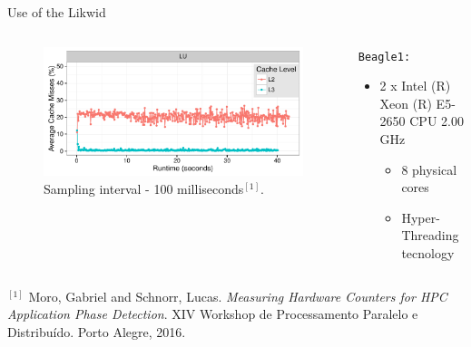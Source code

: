 \documentclass[12pt,xcolor=dvipsnames,presentation]{beamer}
\begin{document}
\begin{frame}[fragile,label={sec:orgd1f265d}]{Use of the Likwid}
 \begin{columns}\begin{column}{.45\linewidth}
\begin{figure}[!htb]
\includegraphics[width=\linewidth]{../../producao/2016_wsppd/img/lu_L2_L3_100ms.pdf}
\caption{Sampling interval - 100 milliseconds$^{[1]}$.}
\label{figFT}
\end{figure}

\end{column}
\begin{column}{.35\linewidth}
{\small
\texttt{Beagle1:}
\begin{itemize}
\item 2 x Intel (R) Xeon (R) E5-2650 CPU 2.00 GHz
\begin{itemize}
\item 8 physical cores
\item Hyper-Threading tecnology
\end{itemize}
\end{itemize}
}
\end{column}
\end{columns}

\vspace{2cm}
\hline
\vspace{0.2cm}
\tiny \(^{[1]}\) \alert{Moro, Gabriel and Schnorr, Lucas}. \emph{Measuring Hardware Counters for
HPC Application Phase Detection}. XIV Workshop de Processamento
Paralelo e Distribuído. Porto Alegre, 2016.
\end{frame}
\end{document}
